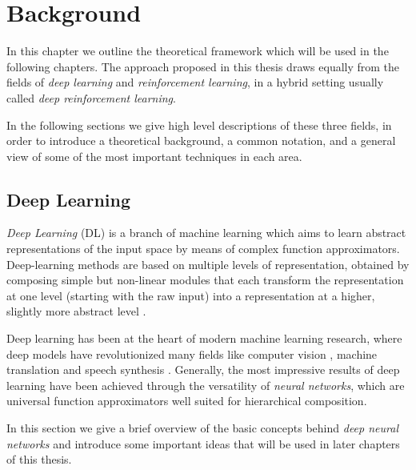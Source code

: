 \chapter{Background}
\label{chapter2_background}
\thispagestyle{empty}

\vspace{0.5cm}

\noindent In this chapter we outline the theoretical framework which will be 
used in the following chapters. The approach proposed in this thesis draws 
equally from the fields of \textit{deep learning} and 
\textit{reinforcement learning}, in a hybrid setting usually called 
\textit{deep reinforcement learning}.

In the following sections we give high level descriptions of these
three fields, in order to introduce a theoretical background, a common notation, 
and a general view of some of the most important techniques in each area. 

\section{Deep Learning} \label{s:DL}
\textit{Deep Learning} (DL) is a branch of machine learning which aims to learn
abstract representations of the input space by means of complex function 
approximators.  Deep-learning methods are based on multiple levels of 
representation, obtained by composing simple but non-linear modules that each 
transform the representation at one level (starting with the raw input) into a 
representation at a higher, slightly more abstract level \cite{lecun2015deep}.

Deep learning has been at the heart of modern machine learning research, 
where deep models have revolutionized many fields like computer vision 
\cite{krizhevsky2012imagenet, szegedy2015going}, machine translation 
\cite{wu2016google} and speech synthesis \cite{vanwavenet}.
Generally, the most impressive results of deep learning have been achieved through
the versatility of \textit{neural networks}, which are universal function 
approximators well suited for hierarchical composition.

In this section we give a brief overview of the basic concepts behind 
\textit{deep neural networks }and introduce some important ideas that will be 
used in later chapters of this thesis.

